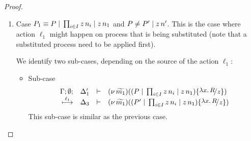 \begin{proof}
\begin{enumerate}
		\item	Case $P_1 \equiv P \;|\; \prod_{i \in I} z\, {n_i} \;|\; z\, {n_1}$ and
				$P \not= P' \;|\; z\, {n'}$. This is the case where action $\ell_1$ might
				happen on process that is being substituted (note that a substituted process
				need to be applied first).

				We identify two sub-cases, depending on the source of the action $\ell_1$:
				\begin{itemize}
					\item	Sub-case
							\begin{eqnarray*}
								\mhorel{\Gamma}{\Delta_1'}{\newsp{\widetilde{m_1}}{(P \Par \prod_{i \in I} \appl{z}{n_i} \Par \appl{z}{n_1}) \subst{{\abs{x}{R}}}{z} }}
								{\hby{\ell_1}}
								{\Delta_3}{}{\newsp{\widetilde{m_1}}{(P' \Par \prod_{i \in I} \appl{z}{n_i} \Par \appl{z}{n_1}) \subst{{\abs{x}{R}}}{z} }}
							\end{eqnarray*}
							This sub-case is similar as the previous case.


\end{itemize}
\end{enumerate}
\end{proof}
